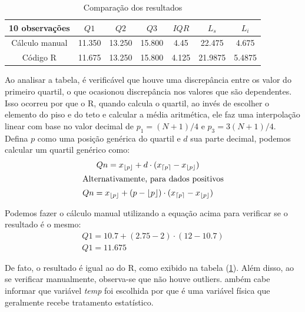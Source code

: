 \documentclass[a4paper, 12pt, titlepage]{article}
\begin{document}
\begin{table}[h!]
    \centering
    \caption{Comparação dos resultados}
    \label{tab:mascara_5u}
    \begin{tabular}{c|c|c|c|c|c|c}
        10 observações& $Q1$ & $Q2$ & $Q3$ & $IQR$ & $L_s$ & $L_i$ \\\hline
        Cálculo manual &11.350 &13.250 &15.800 & 4.45 & 22.475 & 4.675\\ \hline
        Código R &\color{red}11.675 &13.250 &15.800 &\color{red}4.125 &\color{red} 21.9875 &\color{red} 5.4875 \\ 
    \end{tabular}
\end{table}

Ao analisar a tabela, é verificável que houve uma discrepância entre os valor do primeiro quartil, o que ocasionou discrepância nos valores que são dependentes. Isso ocorreu por que o R, quando calcula o quartil, ao invés de escolher o elemento do piso e do teto e calcular a média aritmética, ele faz uma interpolação linear com base no valor decimal de $p_1=(N+1)/4$ e $p_3=3(N+1)/4$. Defina $p$ como uma posição genérica do quartil e $d$ sua parte decimal, podemos calcular um quartil genérico como:
\vspace*{-4mm}
\begin{gather*}
    Qn= x_{\lfloor p \rfloor}+d \cdot (x_{\lceil p \rceil}-x_{\lfloor p \rfloor}) \\
    \intertext{Alternativamente, para dados positivos} 
    Qn= x_{\lfloor p \rfloor}+(p-\lfloor p \rfloor) \cdot (x_{\lceil p \rceil}-x_{\lfloor p \rfloor}) 
\end{gather*} 

Podemos fazer o cálculo manual utilizando a equação acima para verificar se o resultado é o mesmo:
\vspace*{-4mm}
\begin{gather*}
    Q1=10.7+(2.75-2)\cdot (12-10.7) \\
    Q1= 11.675
\end{gather*}
        
De fato, o resultado é igual ao do R, como exibido na tabela (\ref{tab:mascara_5u}). Além disso, ao se verificar manualmente, observa-se que não houve outliers. ambém cabe informar que variável \textit{temp} foi escolhida por que é uma variável física que geralmente recebe tratamento estatístico.
\newpage
\end{document}
